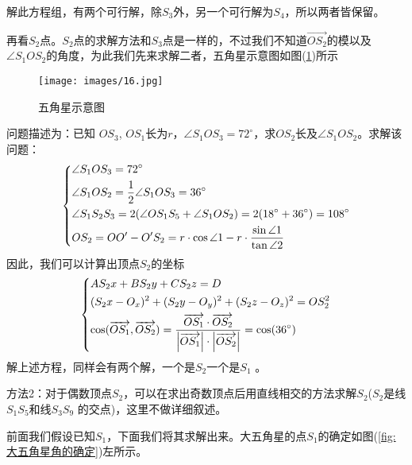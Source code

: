             解此方程组，有两个可行解，除$S_{3}$外，另一个可行解为$S_{4}$，所以两者皆保留。
            \par
            再看$S_{2}$点。$S_{2}$点的求解方法和$S_{3}$点是一样的，不过我们不知道$\overrightarrow{OS_2}$的模以及$\angle{S_{1}OS_{2}}$的角度，为此我们先来求解二者，五角星示意图如图(\ref{fig:五角星示意图})所示
            \begin{figure}[H]
            \centering
            \texttt{[image: images/16.jpg]}
            \caption{五角星示意图}
            \label{fig:五角星示意图}
            \end{figure}
            问题描述为：已知 $OS_3$, $OS_1$长为$r$，$\angle{S_{1}OS_{3}}=72^\circ$，求$OS_2$长及$\angle{S_{1}OS_{2}}$。求解该问题：
            \begin{equation*}
            \centering
            \left\{\begin{lgathered}
            \angle{S_1OS_3}=72^\circ\\
            \angle{S_1OS_2}=\frac{1}{2}\angle{S_1OS_3}=36^\circ\\
            \angle{S_1S_2S_3}=2(\angle{OS_1S_5}+\angle{S_1OS_2})=2(18^\circ+36^\circ)=108^\circ\\
            OS_2=OO'-O'S_2=r\cdot \cos\angle{1}-r\cdot \frac{\sin\angle{1}}{\tan\angle{2}}
            \end{lgathered} \right.
             \end{equation*}
            因此，我们可以计算出顶点$S_2$的坐标
            \begin{equation*}
            \centering
            \left\{\begin{lgathered}
            AS_2x+BS_2y+CS_2z=D\\
            (S_2x-O_x)^2+(S_2y-O_y)^2+(S_2z-O_z)^2=OS_2^2\\
            \cos(\overrightarrow{OS_1},\overrightarrow{OS_2})=\frac{\overrightarrow{OS_1}\cdot\overrightarrow{OS_2}}{\left|\overrightarrow{OS_1}\right|\cdot\left|\overrightarrow{OS_2}\right|}=\cos(36^\circ)
             \end{lgathered} \right.
            \end{equation*}
            解上述方程，同样会有两个解，一个是$S_2$一个是$S_1$ 。
            \par
            方法2：对于偶数顶点$S_2$，可以在求出奇数顶点后用直线相交的方法求解$S_2$($S_2$是线$S_1S_5$和线$S_3S_9$ 的交点)，这里不做详细叙述。
            \par
            前面我们假设已知$S_1$，下面我们将其求解出来。大五角星的点$S_1$的确定如图(\ref{fig:大五角星角的确定})左所示。
